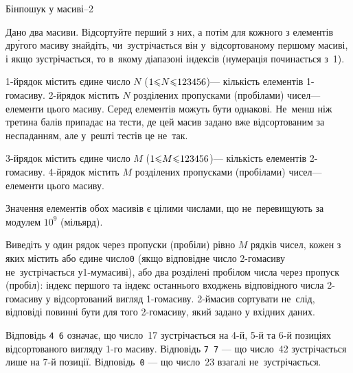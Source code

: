 ﻿\begin{problemAllDefault}{Бінпошук у масиві--2}

Дано два масиви. Відсортуйте перший з них, а потім для кожного з елементів др\'{у}гого масиву знайдіть, чи~зустрічається він у~відсортованому першому масиві, і якщо зустрічається, то в~якому діапазоні індексів (нумерація починається з~1).


\InputFile
\mbox{1-й}\nolinebreak[3] рядок містить єдине число $N$ ($1{\leqslant}N{\leqslant}123456$)\nolinebreak[3] --- кількість елементів \mbox{1-го}\nolinebreak[3] масиву. \mbox{2-й}\nolinebreak[3] рядок містить $N$ розділених пропусками (пробілами) чисел\nolinebreak[3] --- елементи цього масиву. Серед елементів можуть бути однакові. Не~менш ніж третина балів припадає на тести, де цей масив задано вже відсортованим за неспаданням, але у~решті тестів це не~так.

\mbox{3-й}\nolinebreak[3] рядок містить єдине число $M$ ($1{\leqslant}M{\leqslant}123456$)\nolinebreak[3] --- кількість елементів \mbox{2-го}\nolinebreak[3] масиву. \mbox{4-й}\nolinebreak[3] рядок містить $M$ розділених пропусками (пробілами) чисел\nolinebreak[3] --- елементи цього масиву.

Значення елементів обох масивів є цілими числами, що не~перевищують за модулем $10^9$ (мільярд).



\OutputFile
Виведіть у один рядок через пропуски (пробіли) рівно $M$ рядків чисел, кожен з яких містить або єдине число\nolinebreak[3] \verb"0" (якщо відповідне число \mbox{2-го}\nolinebreak[3] масиву не~зустрічається у\nolinebreak[2] \mbox{1-му}\nolinebreak[3] масиві), або два розділені пробілом числа через пропуск (пробіл): індекс першого та індекс останнього входжень відповідного числа \mbox{2-го}\nolinebreak[3] масиву у відсортований вигляд \mbox{1-го}\nolinebreak[3] масиву. \mbox{2-й}\nolinebreak[3] масив сортувати не~слід, відповіді повинні бути для того \mbox{2-го}\nolinebreak[3] масиву, який задано у вхідних даних.


\Example

\begin{example}
%
\end{example}

\Note
Відповідь \verb"4 6" означає, що число~17 зустрічається на \mbox{4-й}, \mbox{5-й} та \mbox{6-й} позиціях відсортованого вигляду 1-го масиву. Відповідь \verb"7 7" --- що число~42 зустрічається лише на 7-й позиції. Відповідь~\verb"0" --- що число~23 взагалі не~зустрічається.

\end{problemAllDefault}

